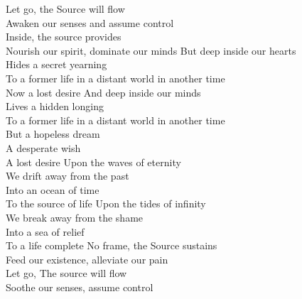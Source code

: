 Let go, the Source will flow\\
Awaken our senses and assume control\\
Inside, the source provides \\
Nourish our spirit, dominate our minds
\hop
But deep inside our hearts\\
Hides a secret yearning\\
To a former life in a distant world in another time\\
Now a lost desire
\hop
And deep inside our minds\\
Lives a hidden longing\\
To a former life in a distant world in another time\\
But a hopeless dream\\
A desperate wish\\
A lost desire
\hops
{} Upon the waves of eternity\\
 We drift away from the past\\
 Into an ocean of time\\
 To the source of life
\hop
{} Upon the tides of infinity\\
 We break away from the shame\\
 Into a sea of relief\\
 To a life complete
\hops
No frame, the Source sustains\\
Feed our existence, alleviate our pain\\
Let go, The source will flow\\
Soothe our senses, assume control